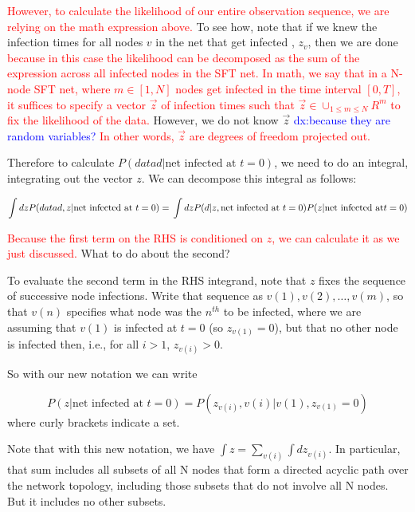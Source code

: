 \documentclass{article}
\begin{document}
	\textcolor{red}{However, to calculate the likelihood of our entire observation
	sequence, we are relying on the math expression above.} To see how, note that if we
	knew the infection
	times for all nodes $v$ in the net that get infected , $z_{v}$, then we are done 
	\textcolor{red}{because in this case the 
	likelihood can be decomposed as the sum of the expression across all infected 
	nodes in the SFT net.} \textcolor{red}{In math, we say that in a N-node SFT net,
	where $m \in [1,N]$ nodes get infected in the time interval $[0,T]$, it suffices to
	specify a vector $\vec{z}$ of infection times such that $\vec{z} \in \cup_{1 \leq 
	m \leq N}R^{m}$ to fix the likelihood of the data.} However, we do not know $\vec{z}$
	\textcolor{blue}{dx:because they are random variables?} \textcolor{red}{In other
	words, $\vec{z}$ are degrees of freedom projected out.}

	Therefore to calculate $P(data d | \text{net infected at } t = 0)$, we need to do an
	integral, integrating out the vector $z$. We can
	decompose this integral as follows:

	\begin{equation}
	   \int dz P(data d, z | \text{net infected at } t = 0) = \\
       	\int dz P(d | z, \text{net infected at } t = 0) P(z | \text{net infected at} t=0)
	\end{equation}
	
	\textcolor{red}{Because the first term on the RHS is conditioned on $z$, we can 
	calculate it as we just discussed.} What to do about the second?

	To evaluate the second term in the RHS integrand, note that $z$ fixes
	the sequence of successive node infections. Write that sequence as
	$v(1), v(2), \ldots, v(m)$, so that $v(n)$ specifies what node was the $n^{th}$
	to be infected, where we are assuming that $v(1)$ is infected at $t = 0$ (so
	$z_{v(1)} = 0$), but that no other node is infected then, i.e., for all 
	$i > 1$, $z_{v(i)} > 0$.

	So with our new notation we can write

	\begin{equation}
	 P(z | \text{net infected at } t = 0) = P({z_{v(i)}}, {v(i)} | v(1), z_{v(1)} = 0)
	\end{equation}
	where curly brackets indicate a set. 

	Note that with this new notation, we have $\int z = \sum_{v(i)} \int dz_{v(i)}$.
	In particular, that sum includes all
	subsets of all N nodes that form a directed acyclic path over the
	network topology, including those subsets that do not involve all N
	nodes. But it includes no other subsets.
\end{document}
